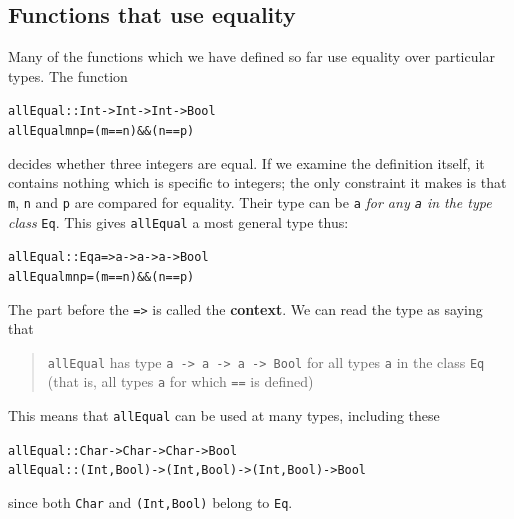 
\subsection*{Functions that use equality}

Many of the functions which we have defined so far use equality
over particular types. The function 
\begin{alltt}
allEqual :: Int -> Int -> Int -> Bool
allEqual m n p = (m==n) \&\& (n==p)
\end{alltt}
decides whether three integers are equal. If we examine the definition
itself, it contains nothing which is specific to integers; the only constraint
it makes is that \texttt{m}, \texttt{n} and \texttt{p} are compared for equality. Their
type can be \texttt{a} \emph{for any \texttt{a} in the type class} \texttt{Eq}. This
gives \texttt{allEqual} a most general type thus:
\begin{alltt}
allEqual :: Eq a => a -> a -> a -> Bool
allEqual m n p = (m==n) \&\& (n==p)
\end{alltt}
The part before the \texttt{=>} is called the \textbf{context}. We can read the type
as saying that 
\begin{quote}
\texttt{allEqual} has type
\texttt{a -> a -> a -> Bool} for all types \texttt{a} in the class \texttt{Eq} (that is,  all types \texttt{a} for which \texttt{==} is defined)
\end{quote}
This means that \texttt{allEqual} can be used at many types, including these
\begin{alltt}
allEqual :: Char -> Char -> Char -> Bool
allEqual :: (Int,Bool) -> (Int,Bool) -> (Int,Bool) -> Bool
\end{alltt}
since both \texttt{Char} and \texttt{(Int,Bool)} belong to \texttt{Eq}.

